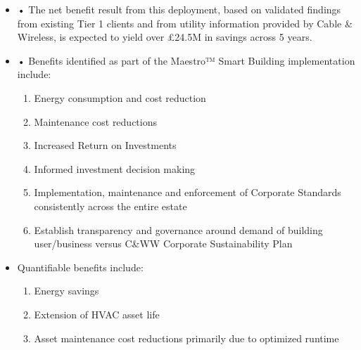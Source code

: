 \begin{itemize}
  \item •	The net benefit result from this deployment, based on validated findings from existing Tier 1 clients and from utility information provided by Cable \& Wireless, is expected to yield over £24.5M in savings across 5 years.
  \item •	Benefits identified as part of the Maestro™ Smart Building implementation include:
  \begin{enumerate}[-]
   \item 	Energy consumption and cost reduction
   \item 	Maintenance cost reductions
   \item 	Increased Return on Investments
   \item 	Informed investment decision making
   \item 	Implementation, maintenance and enforcement of Corporate Standards consistently across the entire estate
   \item 	Establish transparency and governance around demand of building user/business versus C\&WW Corporate Sustainability Plan
  \end{enumerate}
\end{itemize}
\begin{itemize}
  \item 	Quantifiable benefits include:
  \begin{enumerate}[-]
     \item 	Energy savings 
     \item 	Extension of HVAC asset life
     \item 	Asset maintenance cost reductions primarily due to optimized runtime
      
     
   \end{enumerate}
\end{itemize}